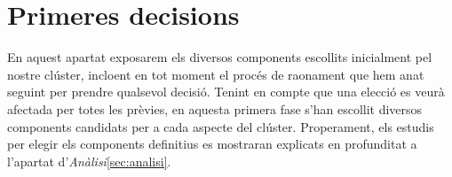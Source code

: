 \section{Primeres decisions}

En aquest apartat exposarem els diversos components escollits inicialment pel nostre clúster, incloent en tot moment el procés de raonament que hem anat seguint per prendre qualsevol decisió. 
Tenint en compte que una elecció es veurà afectada per totes les prèvies, en aquesta primera fase s'han escollit diversos components candidats per a cada aspecte del clúster. Properament, els estudis per elegir els components definitius es mostraran explicats en profunditat a l'apartat d'\textit{Anàlisi}\ref{sec:analisi}.

\clearpage


\clearpage


\clearpage


\clearpage


\clearpage


